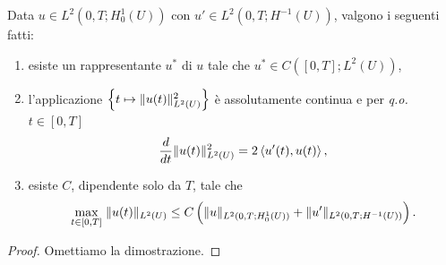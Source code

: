 \begin{teorema}
	Data $u \in L^2(0,T;H^1_0(U))$ con $u' \in L^2(0,T;H^{-1}(U))$, valgono i seguenti fatti:
	\begin{enumerate}[$(a)$]
		\item esiste un rappresentante $u^\ast$ di $u$ tale che $u^\ast \in C([0,T];L^2(U))$,
		\item l'applicazione $\left\lbrace t \mapsto \lVert u(t)\rVert_{L^2(U)}^2\right\rbrace $ è assolutamente continua e per \emph{q.o.} $t \in [0,T]$
		\[ \frac{d}{dt}\lVert u(t)\rVert_{L^2(U)}^2 = 2\braket{u'(t),u(t)}, \]
		\item esiste $C$, dipendente solo da $T$, tale che 
		\[ \underset{t \in [0,T]}{\max}\; \lVert u(t)\rVert_{L^2(U)} \le C\left(  \lVert u\rVert_{L^2(0,T;H^1_0(U))} + \lVert u'\rVert_{L^2(0,T;H^{-1}(U))}\right) . \]
	\end{enumerate}
\end{teorema}
\begin{proof}
	Omettiamo la dimostrazione.
\end{proof}

